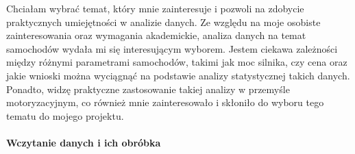 \documentclass[
]{article}
\newenvironment{Shaded}{\begin{snugshade}}{\end{snugshade}}
\newcommand{\AttributeTok}[1]{\textcolor[rgb]{0.77,0.63,0.00}{#1}}
\newcommand{\CommentTok}[1]{\textcolor[rgb]{0.56,0.35,0.01}{\textit{#1}}}
\newcommand{\DecValTok}[1]{\textcolor[rgb]{0.00,0.00,0.81}{#1}}
\newcommand{\DocumentationTok}[1]{\textcolor[rgb]{0.56,0.35,0.01}{\textbf{\textit{#1}}}}
\newcommand{\FunctionTok}[1]{\textcolor[rgb]{0.00,0.00,0.00}{#1}}
\newcommand{\NormalTok}[1]{#1}
\newcommand{\OtherTok}[1]{\textcolor[rgb]{0.56,0.35,0.01}{#1}}
\newcommand{\SpecialCharTok}[1]{\textcolor[rgb]{0.00,0.00,0.00}{#1}}
\newcommand{\StringTok}[1]{\textcolor[rgb]{0.31,0.60,0.02}{#1}}
\begin{document}
Chciałam wybrać temat, który mnie zainteresuje i pozwoli na zdobycie
praktycznych umiejętności w analizie danych. Ze względu na moje osobiste
zainteresowania oraz wymagania akademickie, analiza danych na temat
samochodów wydała mi się interesującym wyborem. Jestem ciekawa
zależności między różnymi parametrami samochodów, takimi jak moc
silnika, czy cena oraz jakie wnioski można wyciągnąć na podstawie
analizy statystycznej takich danych. Ponadto, widzę praktyczne
zastosowanie takiej analizy w przemyśle motoryzacyjnym, co również mnie
zainteresowało i skłoniło do wyboru tego tematu do mojego projektu.

\hypertarget{wczytanie-danych-i-ich-obruxf3bka}{%
\paragraph{Wczytanie danych i ich
obróbka}\label{wczytanie-danych-i-ich-obruxf3bka}}

\begin{Shaded}
\end{Shaded}
\end{document}
